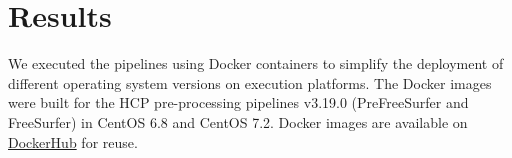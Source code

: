 \documentclass[a4paper,num-refs]{oup-contemporary}
\begin{document}
%



\section{Results}

We executed the pipelines using Docker containers to simplify the 
deployment of different operating system versions on execution 
platforms. The Docker images were built for the HCP pre-processing 
pipelines v3.19.0 (PreFreeSurfer and FreeSurfer) in 
CentOS 6.8 and CentOS 7.2. Docker images are available on 
\href{https://hub.docker.com/r/bigdatalabteam/hcp-prefreesurfer/}{DockerHub}
for reuse. 
\end{document}
